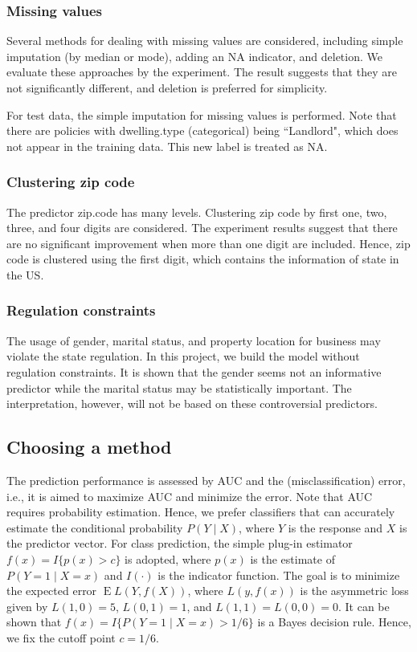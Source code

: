 \documentclass[12pt]{amsart}
\theoremstyle{definition}
\theoremstyle{remark}
\numberwithin{equation}{section}
\newcommand{\E}{\operatorname{E}}
\begin{document}
\subsubsection{Missing values}

Several methods for dealing with missing values are considered, including simple imputation (by median or mode), adding an NA indicator, and deletion. We evaluate these approaches by the experiment. The result suggests that they are not significantly different, and deletion is preferred for simplicity. 


For test data, the simple imputation for missing values is performed. Note that there are policies with dwelling.type (categorical) being ``Landlord", which does not appear in the training data. This new label is treated as NA. 

\subsubsection{Clustering zip code}

The predictor zip.code has many levels. Clustering zip code by first one, two, three, and four digits are considered. The experiment results suggest that there are no significant improvement when more than one digit are included. Hence, zip code is clustered using the first digit, which contains the information of state in the US. 

\subsubsection{Regulation constraints} 

The usage of gender, marital status, and property location for business may violate the state regulation. In this project, we build the model without regulation constraints. It is shown that the gender seems not an informative predictor while the marital status may be statistically important. The interpretation, however, will not be based on these controversial predictors. 

\subsection{Choosing a method}

The prediction performance is assessed by AUC and the (misclassification) error, i.e., it is aimed to maximize AUC and minimize the error. Note that AUC requires probability estimation. Hence, we prefer classifiers that can accurately estimate the conditional probability $P(Y\mid X)$, where $Y$ is the response and $X$ is the predictor vector. For class prediction, the simple plug-in estimator $f(x) = I\{ p(x) > c \}$ is adopted, where $p(x)$ is the estimate of $P(Y = 1\mid X= x)$ and $I(\cdot)$ is the indicator function. The goal is to minimize the expected error $\E L(Y, f(X))$, where $L(y, f(x))$ is the asymmetric loss given by $L(1,0) = 5$, $L(0,1) = 1$, and $L(1,1) = L(0,0) = 0$. It can be shown that $f(x) = I\{ P(Y=1\mid X=x) > 1/6 \}$ is a Bayes decision rule. Hence, we fix the cutoff point $c = 1/6$. 
\end{document}
